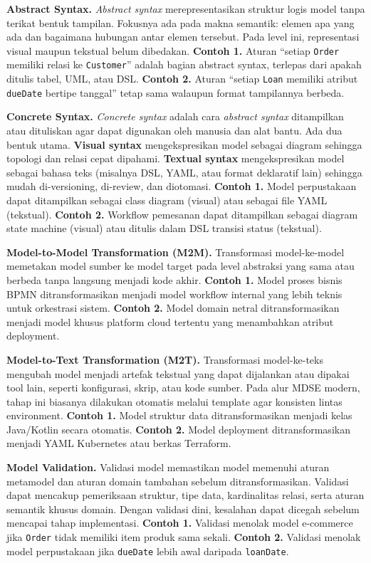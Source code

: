 \textbf{Abstract Syntax.} \textit{Abstract syntax} merepresentasikan struktur logis model tanpa terikat bentuk tampilan. Fokusnya ada pada makna semantik: elemen apa yang ada dan bagaimana hubungan antar elemen tersebut. Pada level ini, representasi visual maupun tekstual belum dibedakan. \textbf{Contoh 1.} Aturan ``setiap \texttt{Order} memiliki relasi ke \texttt{Customer}'' adalah bagian abstract syntax, terlepas dari apakah ditulis tabel, UML, atau DSL. \textbf{Contoh 2.} Aturan ``setiap \texttt{Loan} memiliki atribut \texttt{dueDate} bertipe tanggal'' tetap sama walaupun format tampilannya berbeda.

\textbf{Concrete Syntax.} \textit{Concrete syntax} adalah cara \textit{abstract syntax} ditampilkan atau dituliskan agar dapat digunakan oleh manusia dan alat bantu. Ada dua bentuk utama. \textbf{Visual syntax} mengekspresikan model sebagai diagram sehingga topologi dan relasi cepat dipahami. \textbf{Textual syntax} mengekspresikan model sebagai bahasa teks (misalnya DSL, YAML, atau format deklaratif lain) sehingga mudah di-versioning, di-review, dan diotomasi. \textbf{Contoh 1.} Model perpustakaan dapat ditampilkan sebagai class diagram (visual) atau sebagai file YAML (tekstual). \textbf{Contoh 2.} Workflow pemesanan dapat ditampilkan sebagai diagram state machine (visual) atau ditulis dalam DSL transisi status (tekstual).

\textbf{Model-to-Model Transformation (M2M).} Transformasi model-ke-model memetakan model sumber ke model target pada level abstraksi yang sama atau berbeda tanpa langsung menjadi kode akhir. \textbf{Contoh 1.} Model proses bisnis BPMN ditransformasikan menjadi model workflow internal yang lebih teknis untuk orkestrasi sistem. \textbf{Contoh 2.} Model domain netral ditransformasikan menjadi model khusus platform cloud tertentu yang menambahkan atribut deployment.

\textbf{Model-to-Text Transformation (M2T).} Transformasi model-ke-teks mengubah model menjadi artefak tekstual yang dapat dijalankan atau dipakai tool lain, seperti konfigurasi, skrip, atau kode sumber. Pada alur MDSE modern, tahap ini biasanya dilakukan otomatis melalui template agar konsisten lintas environment. \textbf{Contoh 1.} Model struktur data ditransformasikan menjadi kelas Java/Kotlin secara otomatis. \textbf{Contoh 2.} Model deployment ditransformasikan menjadi YAML Kubernetes atau berkas Terraform.

\textbf{Model Validation.} Validasi model memastikan model memenuhi aturan metamodel dan aturan domain tambahan sebelum ditransformasikan. Validasi dapat mencakup pemeriksaan struktur, tipe data, kardinalitas relasi, serta aturan semantik khusus domain. Dengan validasi dini, kesalahan dapat dicegah sebelum mencapai tahap implementasi. \textbf{Contoh 1.} Validasi menolak model e-commerce jika \texttt{Order} tidak memiliki item produk sama sekali. \textbf{Contoh 2.} Validasi menolak model perpustakaan jika \texttt{dueDate} lebih awal daripada \texttt{loanDate}.

